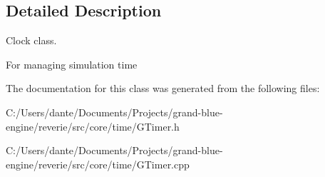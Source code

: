 \subsection{Detailed Description}
Clock class. 

For managing simulation time 

The documentation for this class was generated from the following files\+:\begin{DoxyCompactItemize}
\item 
C\+:/\+Users/dante/\+Documents/\+Projects/grand-\/blue-\/engine/reverie/src/core/time/G\+Timer.\+h\item 
C\+:/\+Users/dante/\+Documents/\+Projects/grand-\/blue-\/engine/reverie/src/core/time/G\+Timer.\+cpp\end{DoxyCompactItemize}
